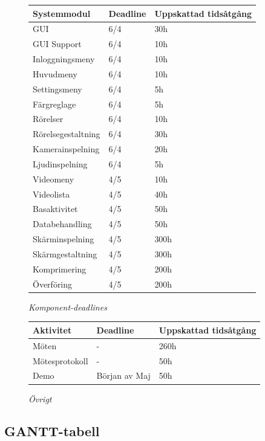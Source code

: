 \begin{figure}[H]
\centering
\begin{tabular}{ | l | l | l |}
  \hline
  \textbf{Systemmodul} & \textbf{Deadline} & \textbf{Uppskattad tidsåtgång} \\ \hline
  GUI & 6/4 & 30h \\ \hline
  GUI Support & 6/4 & 10h \\ \hline
  Inloggningsmeny & 6/4 & 10h \\ \hline
  Huvudmeny & 6/4 & 10h \\ \hline
  Settingsmeny & 6/4 & 5h \\ \hline
  Färgreglage & 6/4 & 5h \\ \hline
  Rörelser & 6/4 & 10h \\ \hline
  Rörelsegestaltning & 6/4 & 30h \\ \hline
  Kamerainspelning & 6/4 & 20h \\ \hline
  Ljudinspelning & 6/4 & 5h \\ \hline
  Videomeny & 4/5 & 10h \\ \hline
  Videolista & 4/5 & 40h \\ \hline
  Basaktivitet & 4/5 & 50h \\ \hline
  Databehandling & 4/5 & 50h \\ \hline
  Skärminspelning & 4/5 & 300h  \\ \hline
  Skärmgestaltning & 4/5 & 300h \\ \hline
  Komprimering & 4/5 & 200h \\ \hline
  Överföring & 4/5 & 200h \\ \hline
\end{tabular}
\caption*{\textit{Komponent-deadlines}}
\end{figure}

\begin{figure}[H]
\centering
\begin{tabular}{ | l | l | l | }
  \hline
  \textbf{Aktivitet} & \textbf{Deadline} & \textbf{Uppskattad tidsåtgång} \\ \hline
  Möten & - & 260h \\ \hline
  Mötesprotokoll & - & 50h \\ \hline
  Demo & Början av Maj & 50h \\ \hline
\end{tabular}
\caption*{\textit{Övrigt}}
\end{figure}

\subsection{GANTT-tabell}

